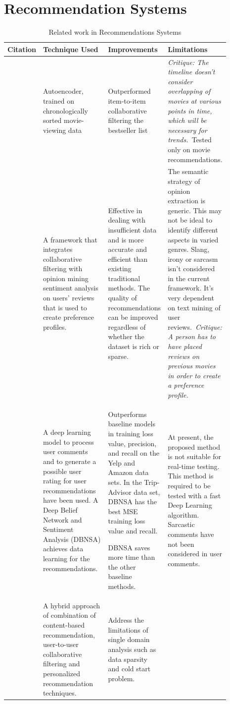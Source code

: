 \documentclass[a4paper, 12pt, oneside]{report}
\begin{document}
\section{Recommendation Systems}
\begin{longtable}{|p{0.17\linewidth}|p{0.18\linewidth}|p{0.27\linewidth}|p{0.27\linewidth}|} 
\caption{Related work in Recommendations Systems}
\label{tab:related-work-table}\\
\hline
Citation & Technique Used & Improvements & Limitations \\ 
\hline
\autocite{larry_history_2019} & Autoencoder, trained on chronologically sorted movie-viewing data & Outperformed item-to-item collaborative filtering  the bestseller list & \textit{Critique: The timeline doesn't consider overlapping of movies at various points in time, which will be necessary for trends.~}Tested only on movie recommendations. \\ 
\hline
\autocite{cheng_hybrid_2020} & A framework that integrates collaborative filtering with opinion mining  sentiment analysis on users' reviews that is used to create preference profiles. & Effective in dealing with insufficient data and is more accurate and efficient than existing traditional methods. The quality of recommendations can be improved regardless of whether the dataset is rich or sparse. & The semantic strategy of opinion extraction is generic. This may not be ideal to identify different aspects in varied genres. Slang, irony or sarcasm isn't considered in the current framework. It's very dependent on text mining of user reviews.~\textit{Critique: A person has to have placed reviews on previous movies in order to create a preference profile.} \\
\hline
\autocite{chen_user_2019} & A deep learning model to process user comments and to generate a possible user rating for user recommendations have been used. A Deep Belief Network and Sentiment Analysis (DBNSA) achieves data learning for the recommendations.~ & Outperforms baseline models in training loss value, precision, and recall on the Yelp and Amazon data sets. In the Trip-Advisor data set, DBNSA has the best MSE training loss value and recall.

DBNSA saves more time than the other baseline methods. & At present, the proposed method is not suitable for real-time testing. This method is required to be tested with a fast Deep Learning algorithm. Sarcastic comments have not been considered in user comments. \\ 
\hline
\autocite{ayushi_cross-domain_2018} & A hybrid approach of combination of content-based recommendation, user-to-user collaborative filtering and personalized recommendation techniques. & Address the limitations of single domain analysis such as data sparsity and cold start problem.


\end{longtable}
\end{document}
